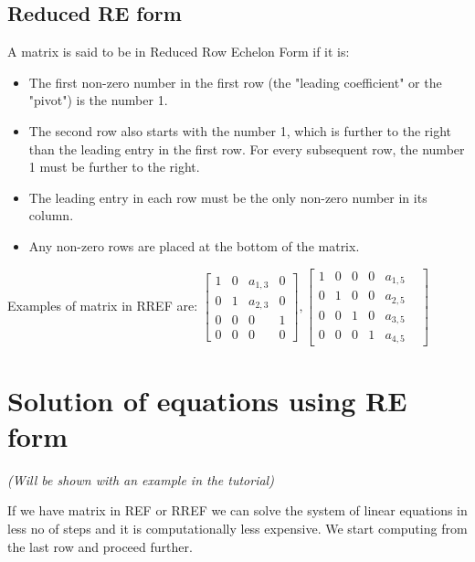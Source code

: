\documentclass[a4paper]{article}
\begin{document}
\subsection{Reduced RE form}
A matrix is said to be in Reduced Row Echelon Form if it is:
\begin{itemize}
    \item The first non-zero number in the first row (the "leading coefficient" or the "pivot") is the number 1.
    \item The second row also starts with the number 1, which is further to the right than the leading entry in the first row. For every subsequent row, the number 1 must be further to the right.
    \item The leading entry in each row must be the only non-zero number in its column.
    \item Any non-zero rows are placed at the bottom of the matrix.
\end{itemize}
Examples of matrix in RREF are: 
$
\begin{bmatrix}
    1 & 0 & a_{1,3} & 0 \\ 
    0 & 1 &  a_{2,3} & 0 \\
    0 & 0 & 0  &    1  \\
    0 & 0 & 0 & 0 
    \end{bmatrix}
    ,
    \begin{bmatrix}
    1 & 0 & 0 & 0 & a_{1,5} \\ 
    0 & 1 &  0 & 0 & a_{2,5} \\
    0 & 0 & 1  & 0 & a_{3,5}  \\
    0 & 0 & 0 & 1 &  a_{4,5} &
    \end{bmatrix}
$

\section{Solution of equations using RE form}
\textit{(Will be shown with an example in the tutorial)}

If we have matrix in REF or RREF we can solve the system of linear equations in less no of steps and it is computationally less expensive.
We start computing from the last row and proceed further. 
\end{document}
